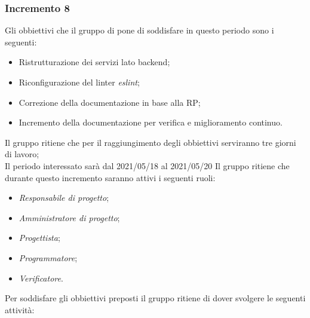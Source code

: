 \subsubsection{Incremento 8}
Gli obbiettivi che il gruppo di pone di soddisfare in questo periodo sono i seguenti:
\begin{itemize}
    \item Ristrutturazione dei servizi lato backend;
    \item Riconfigurazione del linter \textit{eslint};
    \item Correzione della documentazione in base alla RP;
    \item Incremento della documentazione per verifica e miglioramento continuo.
\end{itemize}
Il gruppo ritiene che per il raggiungimento degli obbiettivi serviranno tre giorni di lavoro;\\
Il periodo interessato sarà dal 2021/05/18 al 2021/05/20
Il gruppo ritiene che durante questo incremento saranno attivi i seguenti ruoli:
\begin{itemize}
    \item \textit{Responsabile di progetto};
    \item \textit{Amministratore di progetto};
    \item \textit{Progettista};
    \item \textit{Programmatore};
    \item \textit{Verificatore}.
\end{itemize}
Per soddisfare gli obbiettivi preposti il gruppo ritiene di dover svolgere le seguenti attività:
